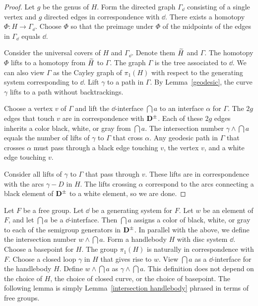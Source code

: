 \begin{proof}
Let $g$ be the genus of $H$.  Form the directed graph $\Gamma_{\dd}$ consisting of a single vertex and $g$ directed edges in correspondence with $\dd$.  There exists a homotopy $\Phi:H\rightarrow\Gamma_{\dd}$.  Choose $\Phi$ so that the preimage under $\Phi$ of the midpoints of the edges in $\Gamma_{\dd}$ equals $\dd$.

Consider the universal covers of $H$ and $\Gamma_{\dd}$.  Denote them $\widetilde{H}$ and $\Gamma$.  The homotopy $\Phi$ lifts to a homotopy from $\widetilde{H}$ to $\Gamma$.  The graph $\Gamma$ is the tree associated to $\dd$.  We can also view $\Gamma$ as the Cayley graph of $\pi_{1}(H)$ with respect to the generating system corresponding to $\dd$.  Lift $\gamma$ to a path in $\Gamma$.  By Lemma~\ref{geodesic}, the curve $\gamma$ lifts to a path without backtrackings.

Choose a vertex $v$ of $\Gamma$ and lift the $\dd$-interface $\dint{a}$ to an interface $\alpha$ for $\Gamma$.  The $2g$ edges that touch $v$ are in correspondence with $\mathbf{D}^\pm$.  Each of these $2g$ edges inherits a color black, white, or gray from $\dint{a}$.  The intersection number $\gamma\wedge\dint{a}$ equals the number of lifts of $\gamma$ to $\Gamma$ that cross $\alpha$.  Any geodesic path in $\Gamma$ that crosses $\alpha$ must pass through a black edge touching $v$, the vertex $v$, and a white edge touching $v$.  

Consider all lifts of $\gamma$ to $\Gamma$ that pass through $v$.  These lifts are in correspondence with the arcs $\gamma-D$ in $H$.  The lifts crossing $\alpha$ correspond to the arcs connecting a black element of $\mathbf{D}^\pm$ to a white element, so we are done.
\end{proof}

Let $F$ be a free group.  Let $\dd$ be a generating system for $F$.  Let $w$ be an element of $F$, and let $\dint{a}$ be a $\dd$-interface.  Then $\dint{a}$ assigns a color of black, white, or gray to each of the semigroup generators in $\mathbf{D}^\pm$.  In parallel with the above, we define the intersection number $w\wedge\dint{a}$.  Form a handlebody $H$ with disc system $\dd$.  Choose a basepoint for $H$.  The group $\pi_{1}(H)$ is naturally in correspondence with $F$.  Choose a closed loop $\gamma$ in $H$ that gives rise to $w$.  View $\dint{a}$ as a $\dd$-interface for the handlebody $H$.  Define $w\wedge\dint{a}$ as $\gamma\wedge\dint{a}$.  This definition does not depend on the choice of $H$, the choice of closed curve, or the choice of basepoint.  The following lemma is simply Lemma~\ref{intersection handlebody} phrased in terms of free groups.

